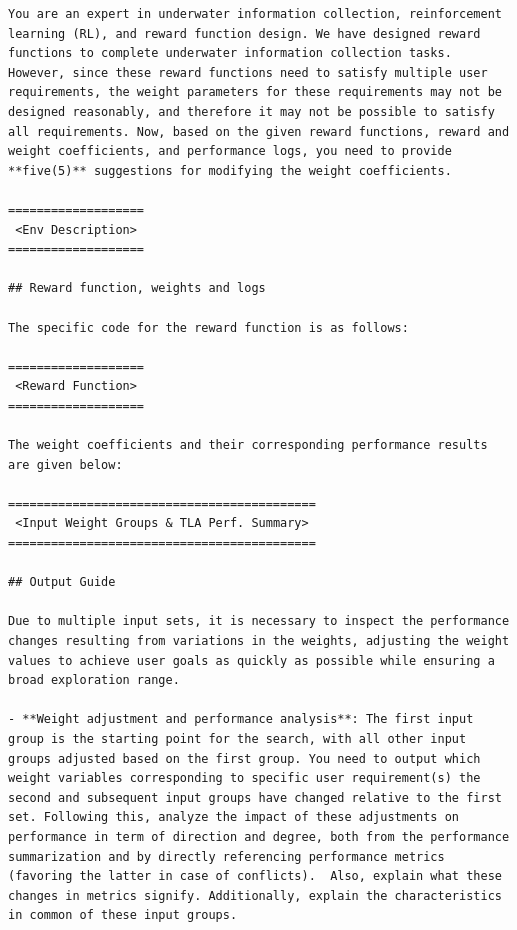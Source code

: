 \documentclass{article}
\begin{document}
\begin{verbatim}
You are an expert in underwater information collection, reinforcement learning (RL), and reward function design. We have designed reward functions to complete underwater information collection tasks. However, since these reward functions need to satisfy multiple user requirements, the weight parameters for these requirements may not be designed reasonably, and therefore it may not be possible to satisfy all requirements. Now, based on the given reward functions, reward and weight coefficients, and performance logs, you need to provide **five(5)** suggestions for modifying the weight coefficients.

===================
 <Env Description>
===================

## Reward function, weights and logs

The specific code for the reward function is as follows:

===================
 <Reward Function>
===================

The weight coefficients and their corresponding performance results are given below:

===========================================
 <Input Weight Groups & TLA Perf. Summary>
===========================================

## Output Guide

Due to multiple input sets, it is necessary to inspect the performance changes resulting from variations in the weights, adjusting the weight values to achieve user goals as quickly as possible while ensuring a broad exploration range.

- **Weight adjustment and performance analysis**: The first input group is the starting point for the search, with all other input groups adjusted based on the first group. You need to output which weight variables corresponding to specific user requirement(s) the second and subsequent input groups have changed relative to the first set. Following this, analyze the impact of these adjustments on performance in term of direction and degree, both from the performance summarization and by directly referencing performance metrics (favoring the latter in case of conflicts).  Also, explain what these changes in metrics signify. Additionally, explain the characteristics in common of these input groups.


\end{verbatim}
\end{document}
